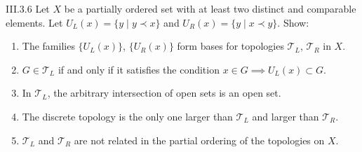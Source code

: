 \begin{problem}{III.3.6}\label{problem:III.3.6}
Let \( X \) be a partially ordered set {\color{red}with at least two distinct and comparable elements}. Let \( U_{L}(x) = \{y \mid y \prec x\} \) and \( U_{R}(x) = \{y \mid x \prec y\} \). Show:
\begin{enumerate}[label={(\alph*)}]
	\item The families \(\{U_{L}(x)\}\), \(\{U_{R}(x)\}\) form bases for topologies \(\mathscr{T}_{L}\), \(\mathscr{T}_{R}\) in \(X\).
	\item \( G \in \mathscr{T}_{L} \) if and only if it satisfies the condition \( x \in G \implies U_{L}(x) \subset G \).
	\item In \(\mathscr{T}_{L}\), the arbitrary intersection of open sets is an open set.
	\item The discrete topology is the only one larger than \(\mathscr{T}_{L}\) and larger than \(\mathscr{T}_{R}\).
	\item \(\mathscr{T}_{L}\) and \(\mathscr{T}_{R}\) are not related in the partial ordering of the topologies on \(X\).
\end{enumerate}
\end{problem}

